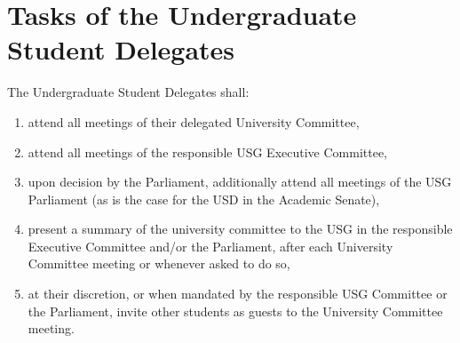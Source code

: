 \section{Tasks of the Undergraduate Student Delegates}
The Undergraduate Student Delegates shall:
\begin{enumerate}
    \item attend all meetings of their delegated University Committee,
    \item attend all meetings of the responsible USG Executive Committee,
    \item upon decision by the Parliament, additionally attend all meetings of the USG Parliament (as is the case for the USD in the Academic Senate),
    \item present a summary of the university committee to the USG in the responsible Executive Committee and/or the Parliament, after each University Committee meeting or whenever asked to do so,
    \item at their discretion, or when mandated by the responsible USG Committee or the Parliament, invite other students as guests to the University Committee meeting.
\end{enumerate}